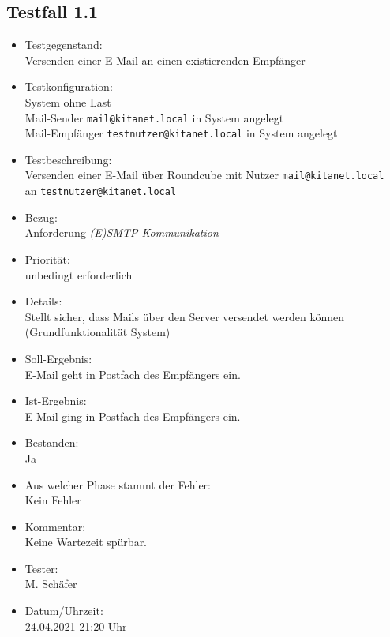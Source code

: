 \subsection{Testfall 1.1}
\begin{itemize}
	\item Testgegenstand:\\
	Versenden einer E-Mail an einen existierenden Empfänger
	\item Testkonfiguration:\\
	System ohne Last\\
	Mail-Sender \verb+mail@kitanet.local+ in System angelegt\\
	Mail-Empfänger \verb+testnutzer@kitanet.local+ in System angelegt
	\item Testbeschreibung:\\
	Versenden einer E-Mail über Roundcube mit Nutzer \verb+mail@kitanet.local+ \\ an \verb+testnutzer@kitanet.local+
	\item Bezug:\\
	Anforderung \textit{(E)SMTP-Kommunikation}
	\item Priorität:\\
	unbedingt erforderlich
	\item Details:\\
	Stellt sicher, dass Mails über den Server versendet werden können (Grundfunktionalität System)
	\item Soll-Ergebnis:\\
	E-Mail geht in Postfach des Empfängers ein.
	\item Ist-Ergebnis:\\
	E-Mail ging in Postfach des Empfängers ein.
	\item Bestanden:\\
	Ja
	\item Aus welcher Phase stammt der Fehler:\\
	Kein Fehler
	\item Kommentar:\\
	Keine Wartezeit spürbar.
	\item Tester:\\
	M. Schäfer
	\item Datum/Uhrzeit:\\
	24.04.2021 21:20 Uhr
\end{itemize}

